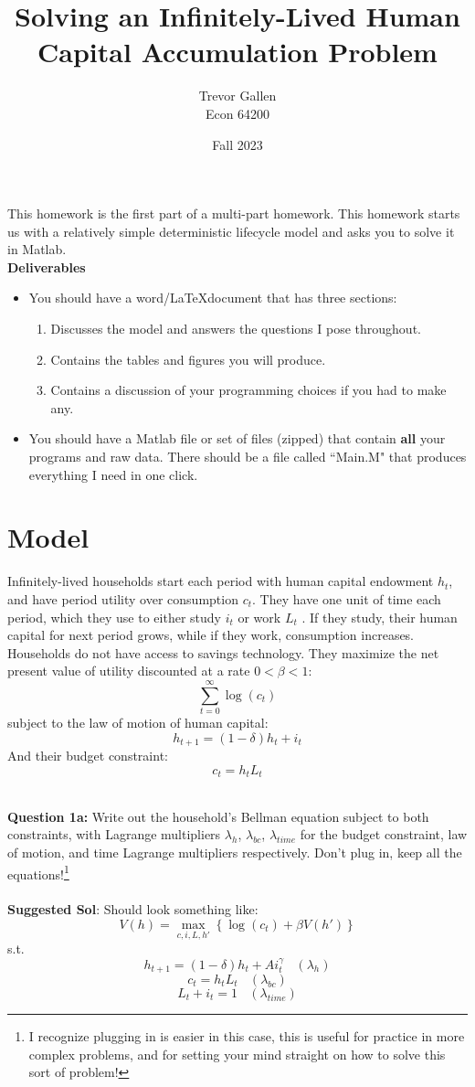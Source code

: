 \documentclass[11pt]{article}
\title{Solving an Infinitely-Lived Human Capital Accumulation Problem}
\author{ Trevor Gallen \\ Econ 64200 }
\date{Fall 2023}
\begin{document}


\maketitle

This homework is the first part of a multi-part homework.  This homework starts us with a relatively simple deterministic lifecycle model and asks you to solve it in Matlab.\\

\textbf{Deliverables}
\begin{itemize}
\item You should have a word/\LaTeX document that has three sections: 
\begin{enumerate}
\item Discusses the model and answers the questions I pose throughout.
\item Contains the tables and figures you will produce.
\item Contains a discussion of your programming choices if you had to make any.
\end{enumerate}
\item You should have a Matlab file or set of files (zipped) that contain \textbf{all} your programs and raw data.  There should be a file called ``Main.M" that produces everything I need in one click.
\end{itemize}


\section{Model}
Infinitely-lived households start each period with human capital endowment $h_t$, and have period utility over consumption $c_t$.  They have one unit of time each period, which they use to either study $i_t$ or work $L_t$ . If they study, their human capital for next period grows, while if they work, consumption increases.  Households do not have access to savings technology.  They maximize the net present value of utility discounted at a rate $0<\beta<1$:
$$\sum_{t=0}^\infty \log(c_t)$$
subject to the law of motion of human capital:
$$h_{t+1}=(1-\delta)h_t+i_t$$
And their budget constraint:
$$c_t=h_tL_t$$

\ \\
\textbf{Question 1a:} Write out the household's Bellman equation subject to both constraints, with Lagrange multipliers $\lambda_{h}$,  $\lambda_{bc}$, $\lambda_{time}$ for the budget constraint, law of motion, and time Lagrange multipliers respectively. Don't plug in, keep all the equations!\footnote{I recognize plugging in is easier in this case, this is useful for practice in more complex problems, and for setting your mind straight on how to solve this sort of problem!}\\
\ \\
\textbf{Suggested Sol}: Should look something like:
$$V(h)=\underset{c,i,L,h'}{\max}\left\{\log(c_t)+\beta V(h')\right\}$$
s.t.
$$h_{t+1}=(1-\delta)h_t+Ai_t^\gamma \ \ \ \ (\lambda_h)$$
$$c_t=h_tL_t\ \ \ \ (\lambda_{bc})$$
$$L_t+i_t=1\ \ \ \ (\lambda_{time})$$
\end{document}

